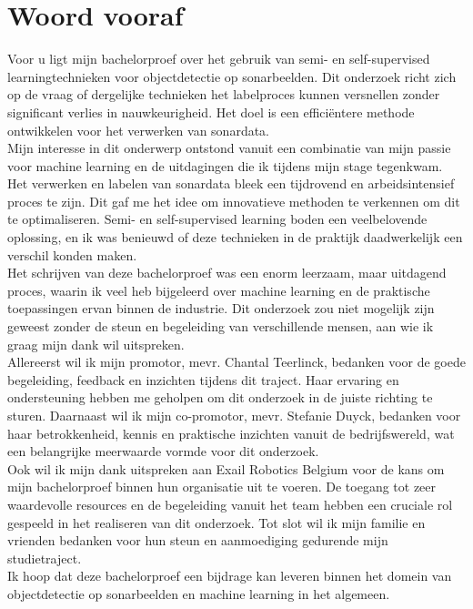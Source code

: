 
\chapter*{Woord vooraf}%
\label{ch:voorwoord}

Voor u ligt mijn bachelorproef over het gebruik van semi- en self-supervised learningtechnieken voor objectdetectie op sonarbeelden. Dit onderzoek richt zich op de vraag of dergelijke technieken het labelproces kunnen versnellen zonder significant verlies in nauwkeurigheid. Het doel is een efficiëntere methode ontwikkelen voor het verwerken van sonardata. \\

Mijn interesse in dit onderwerp ontstond vanuit een combinatie van mijn passie voor machine learning en de uitdagingen die ik tijdens mijn stage tegenkwam. Het verwerken en labelen van sonardata bleek een tijdrovend en arbeidsintensief proces te zijn. Dit gaf me het idee om innovatieve methoden te verkennen om dit te optimaliseren. Semi- en self-supervised learning boden een veelbelovende oplossing, en ik was benieuwd of deze technieken in de praktijk daadwerkelijk een verschil konden maken. \\

Het schrijven van deze bachelorproef was een enorm leerzaam, maar uitdagend proces, waarin ik veel heb bijgeleerd over machine learning en de praktische toepassingen ervan binnen de industrie. Dit onderzoek zou niet mogelijk zijn geweest zonder de steun en begeleiding van verschillende mensen, aan wie ik graag mijn dank wil uitspreken. \\

Allereerst wil ik mijn promotor, mevr. Chantal Teerlinck, bedanken voor de goede begeleiding, feedback en inzichten tijdens dit traject. Haar ervaring en ondersteuning hebben me geholpen om dit onderzoek in de juiste richting te sturen. Daarnaast wil ik mijn co-promotor, mevr. Stefanie Duyck, bedanken voor haar betrokkenheid, kennis en praktische inzichten vanuit de bedrijfswereld, wat een belangrijke meerwaarde vormde voor dit onderzoek. \\

Ook wil ik mijn dank uitspreken aan Exail Robotics Belgium voor de kans om mijn bachelorproef binnen hun organisatie uit te voeren. De toegang tot zeer waardevolle resources en de begeleiding vanuit het team hebben een cruciale rol gespeeld in het realiseren van dit onderzoek. Tot slot wil ik mijn familie en vrienden bedanken voor hun steun en aanmoediging gedurende mijn studietraject. \\

Ik hoop dat deze bachelorproef een bijdrage kan leveren binnen het domein van objectdetectie op sonarbeelden en machine learning in het algemeen.